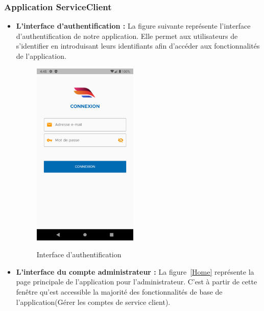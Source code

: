 \subsubsection{Application ServiceClient}
\begin{itemize}[label=$\ast$]
	\item \textbf{L’interface
		d’authentification
		:} La figure suivante représente l’interface d’authentification de notre application. Elle permet aux utilisateurs de s’identifier en introduisant leurs identifiants afin d’accéder aux fonctionnalités de l’application.
	
	\begin{figure}%
		\centering
		{{\includegraphics[width=5cm]{./Template LaTeX/Images/From_emu/login.png} }}%
		\caption{Interface d'authentification}%
		\label{fig:example}%
	\end{figure}
	\newpage
	\item \textbf{L’interface du compte administrateur
		:} La figure~\ref{Home} représente la page principale de l’application pour l'administrateur. C’est à partir de cette fenêtre qu’est accessible la majorité des fonctionnalités de base de l’application(Gérer les comptes de service client).

\end{itemize}
